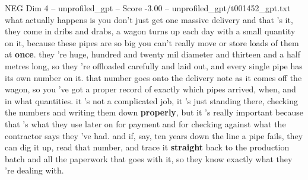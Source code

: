 \begin{textsample}{NEG Dim 4 – unprofiled\_gpt – Score -3.00 – unprofiled\_gpt/t001452\_gpt.txt}  \label{ex:f4_neg_023}
what actually happens is you don't just get one massive delivery and that ’s it, they come in dribs and drabs, a wagon turns up each day with a small quantity on it, because these pipes are so big you can't really move or store loads of them at \textbf{once}. they ’re huge, hundred and twenty mil diameter and thirteen and a half metres long, so they ’re offloaded carefully and laid out, and every single pipe has its own number on it. that number goes onto the delivery note as it comes off the wagon, so you ’ve got a proper record of exactly which pipes arrived, when, and in what quantities. it ’s not a complicated job, it ’s just standing there, checking the numbers and writing them down \textbf{properly}, but it ’s really important because that ’s what they use later on for payment and for checking against what the contractor says they ’ve had. and if, say, ten years down the line a pipe fails, they can dig it up, read that number, and trace it \textbf{straight} back to the production batch and all the paperwork that goes with it, so they know exactly what they ’re dealing with.

\end{textsample}
